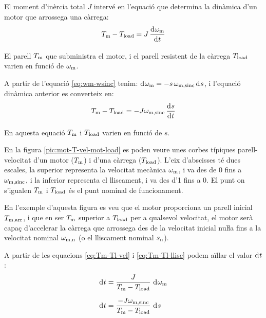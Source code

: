 El moment d'inèrcia total $J$ intervé en l'equació que  determina la dinàmica d'un motor que arrossega una càrrega:
\begin{equation}\label{eq:Tm-Tl-vel}
    T\ped{m} - T\ped{load} = J\,\frac{\diff \omega\ped{m}}{\diff t}
\end{equation}

El parell $T_\mathrm{m}$ que subministra el motor, i el parell resistent de la càrrega $T_\mathrm{load}$ varien en funció de $\omega_\mathrm{m}$.

A partir de l'equació \eqref{eq:wm-wsinc} tenim: $\diff \omega\ped{m} = -s\,\omega\ped{m,sinc} \diff s$, i l'equació dinàmica anterior es converteix en:
\begin{equation}\label{eq:Tm-Tl-llisc}
    T\ped{m} - T\ped{load} = -J \omega\ped{m,sinc}\,\frac{\diff s}{\diff t}
\end{equation}

En aquesta equació $T_\mathrm{m}$ i $T_\mathrm{load}$ varien en funció de $s$.


En la figura \vref{pic:mot-T-vel-mot-load} es poden veure unes corbes típiques parell-velocitat d'un motor ($T_\mathrm{m}$) i d'una  càrrega ($T_\mathrm{load}$). L'eix d'abscisses té dues escales, la superior representa la velocitat mecànica $\omega_\mathrm{m}$, i va des de 0 fins a $\omega_\mathrm{m,sinc}$, i la inferior representa el lliscament, i va des d'1 fins a 0. El punt on s'igualen $T_\mathrm{m}$ i $T_\mathrm{load}$ és el punt nominal de funcionament.

En l'exemple d'aquesta figura es veu que el motor proporciona un parell inicial $T_\mathrm{m,arr}$, i que en ser $T_\mathrm{m}$  superior a $T_\mathrm{load}$ per a qualsevol velocitat, el motor serà  capaç d'accelerar la càrrega que arrossega des de la velocitat inicial nuŀla fins a la velocitat nominal $\omega_\mathrm{m,n}$ (o el lliscament nominal $s_\mathrm{n}$).
\begin{center}
    
    \label{pic:mot-T-vel-mot-load}
\end{center}

A partir de les equacions \eqref{eq:Tm-Tl-vel} i \eqref{eq:Tm-Tl-llisc} podem aïllar el valor $\diff t$:
\begin{subequations}
\begin{align}
    \diff t &= \frac{J}{T\ped{m}-T\ped{load}}\,\diff\omega\ped{m}\\[1.5ex]
    \diff t &= \frac{-J \omega\ped{m,sinc}}{T\ped{m}-T\ped{load}}\,\diff s
\end{align}
\end{subequations}

